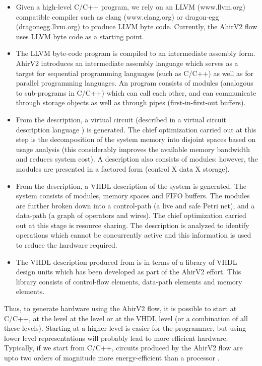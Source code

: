 \begin{itemize}
\item Given a high-level C/C++ program, we rely on
an LLVM (www.llvm.org) compatible compiler such as clang (www.clang.org)
or dragon-egg (dragonegg.llvm.org) to produce LLVM byte code.
Currently, the AhirV2 flow uses LLVM byte code as a starting point.
\item The LLVM byte-code program is compiled
to an intermediate assembly form.  AhirV2
introduces an intermediate assembly language
\Aa  which serves as a target for sequential
programming languages (such as C/C++) as
well as for parallel programming languages.
An \Aa program consists of modules (analogous
to sub-programs in C/C++) which can call each 
other, and can communicate through storage objects
as well as through pipes (first-in-first-out buffers).
\item From the \Aa description, a virtual
circuit (described in a virtual circuit
description language \vC) is generated.
The chief optimization carried out at this
step is the decomposition of the system memory
into disjoint spaces based on usage
analysis (this considerably improves the
available memory bandwidth and reduces
system cost).  A \vC description also
consists of modules: however, the modules
are presented in a factored form (control X data X storage).
\item From the \vC description, a
VHDL description of the system is generated.
The system consists of modules, memory spaces
and FIFO buffers.  The modules are further
broken down into a control-path (a live and safe
Petri net), and a data-path (a graph of operators
and wires).
The chief optimization carried out at this
stage is resource sharing.  The \vC description
is analyzed to identify operations which
cannot be concurrently active and this information
is used to reduce the hardware required.
\item 
The VHDL description produced from 
\vC is in terms of a library
of VHDL design units which has been developed
as part of the AhirV2  effort.  This library
consists of control-flow elements, data-path
elements and memory elements.
\end{itemize}

Thus, to generate hardware using the AhirV2 flow,
it is possible to start at C/C++, at the \Aa level
at the \vC level or at the VHDL level (or a combination
of all these levels).  Starting at a higher level is
easier for the programmer, but using lower level representations
will probably lead to more efficient hardware.
Typically, if we start from C/C++, circuits
produced by the AhirV2 flow are upto two orders of
magnitude more energy-efficient than
a processor \cite{ref:dsd2010}.  

